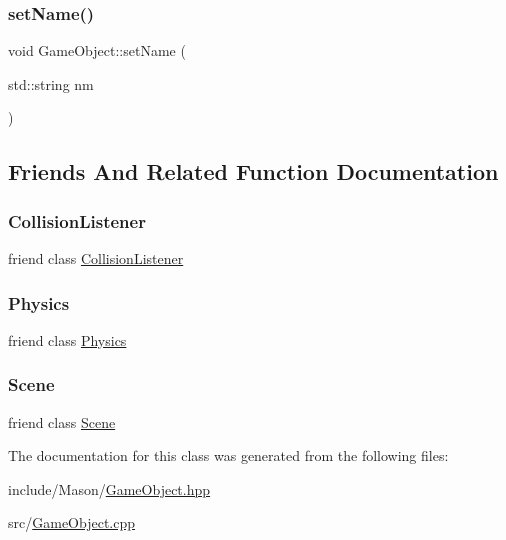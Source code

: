 \subsubsection{\texorpdfstring{set\+Name()}{setName()}}
{\footnotesize\ttfamily void Game\+Object\+::set\+Name (\begin{DoxyParamCaption}\item[{std\+::string}]{nm }\end{DoxyParamCaption})}



\subsection{Friends And Related Function Documentation}
\hypertarget{class_mason_1_1_game_object_a14616e15958c3b2a779b1d32001aaf34}{}\label{class_mason_1_1_game_object_a14616e15958c3b2a779b1d32001aaf34} 
\subsubsection{\texorpdfstring{Collision\+Listener}{CollisionListener}}
{\footnotesize\ttfamily friend class \hyperlink{class_mason_1_1_collision_listener}{Collision\+Listener}\hspace{0.3cm}{\ttfamily [friend]}}

\hypertarget{class_mason_1_1_game_object_a2bfcbae6c8e1d7af93c5ac1200b1535c}{}\label{class_mason_1_1_game_object_a2bfcbae6c8e1d7af93c5ac1200b1535c} 
\subsubsection{\texorpdfstring{Physics}{Physics}}
{\footnotesize\ttfamily friend class \hyperlink{class_mason_1_1_physics}{Physics}\hspace{0.3cm}{\ttfamily [friend]}}

\hypertarget{class_mason_1_1_game_object_a032858ae1fe02d2d1170981c2af2d67c}{}\label{class_mason_1_1_game_object_a032858ae1fe02d2d1170981c2af2d67c} 
\subsubsection{\texorpdfstring{Scene}{Scene}}
{\footnotesize\ttfamily friend class \hyperlink{class_mason_1_1_scene}{Scene}\hspace{0.3cm}{\ttfamily [friend]}}



The documentation for this class was generated from the following files\+:\begin{DoxyCompactItemize}
\item 
include/\+Mason/\hyperlink{_game_object_8hpp}{Game\+Object.\+hpp}\item 
src/\hyperlink{_game_object_8cpp}{Game\+Object.\+cpp}\end{DoxyCompactItemize}
